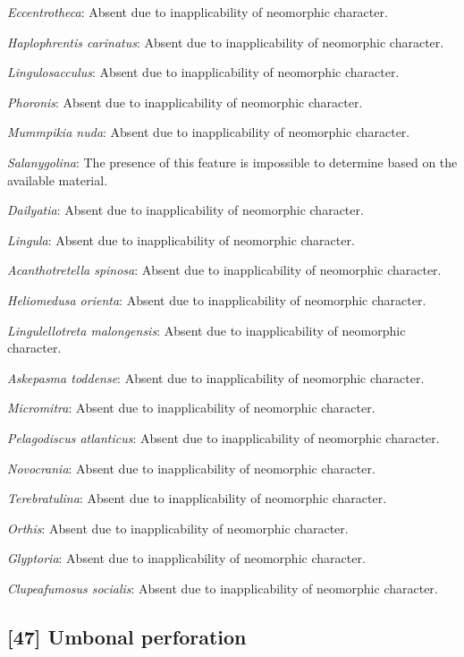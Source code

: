 \documentclass[]{book}
\theoremstyle{definition}
\theoremstyle{definition}
\theoremstyle{definition}
\theoremstyle{remark}
\begin{document}
\emph{Eccentrotheca}: Absent due to inapplicability of neomorphic
character.

\emph{Haplophrentis carinatus}: Absent due to inapplicability of
neomorphic character.

\emph{Lingulosacculus}: Absent due to inapplicability of neomorphic
character.

\emph{Phoronis}: Absent due to inapplicability of neomorphic character.

\emph{Mummpikia nuda}: Absent due to inapplicability of neomorphic
character.

\emph{Salanygolina}: The presence of this feature is impossible to
determine based on the available material.

\emph{Dailyatia}: Absent due to inapplicability of neomorphic character.

\emph{Lingula}: Absent due to inapplicability of neomorphic character.

\emph{Acanthotretella spinosa}: Absent due to inapplicability of
neomorphic character.

\emph{Heliomedusa orienta}: Absent due to inapplicability of neomorphic
character.

\emph{Lingulellotreta malongensis}: Absent due to inapplicability of
neomorphic character.

\emph{Askepasma toddense}: Absent due to inapplicability of neomorphic
character.

\emph{Micromitra}: Absent due to inapplicability of neomorphic
character.

\emph{Pelagodiscus atlanticus}: Absent due to inapplicability of
neomorphic character.

\emph{Novocrania}: Absent due to inapplicability of neomorphic
character.

\emph{Terebratulina}: Absent due to inapplicability of neomorphic
character.

\emph{Orthis}: Absent due to inapplicability of neomorphic character.

\emph{Glyptoria}: Absent due to inapplicability of neomorphic character.

\emph{Clupeafumosus socialis}: Absent due to inapplicability of
neomorphic character.

\hypertarget{umbonal-perforation}{%
\subsection*{{[}47{]} Umbonal perforation}\label{umbonal-perforation}}
\end{document}
